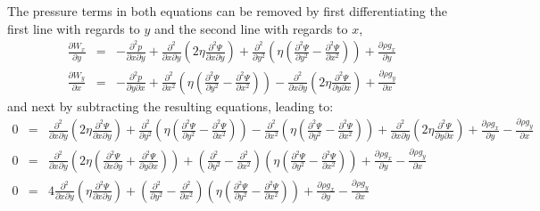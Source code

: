 The pressure terms in both equations can be removed by first differentiating
the first line with regards to $y$ and the second line with regards to $x$, 
\begin{eqnarray}
\frac{\partial W_x}{\partial y}&=&-\frac{\partial^2 p}{\partial x \partial y} 
+ \frac{\partial^2 }{\partial x \partial y} \left(2\eta \frac{\partial^2 \Psi}{\partial x \partial y} \right)
+ \frac{\partial^2 }{\partial y^2} \left( \eta (\frac{\partial^2 \Psi}{\partial y^2}-\frac{\partial^2 \Psi}{\partial x^2}) \right)
+ \frac{\partial \rho g_x}{\partial y}
\\
\frac{\partial W_y}{\partial x}&=&-\frac{\partial^2 p}{\partial y \partial x} 
+ \frac{\partial^2 }{\partial x^2} \left( \eta (\frac{\partial^2 \Psi}{\partial y^2}-\frac{\partial^2 \Psi}{\partial x^2}) \right) 
- \frac{\partial^2 }{\partial x\partial y} \left(2\eta \frac{\partial^2 \Psi}{\partial y \partial x} \right)
+ \frac{\partial \rho g_y}{\partial x}
\end{eqnarray}
and next by subtracting the resulting equations, leading to:
\begin{eqnarray}
0 &=& 
\frac{\partial^2 }{\partial x \partial y} \left(2\eta \frac{\partial^2 \Psi}{\partial x \partial y} \right)
+ \frac{\partial^2 }{\partial y^2} \left( \eta (\frac{\partial^2 \Psi}{\partial y^2}-\frac{\partial^2 \Psi}{\partial x^2}) \right)
- \frac{\partial^2 }{\partial x^2} \left( \eta (\frac{\partial^2 \Psi}{\partial y^2}-\frac{\partial^2 \Psi}{\partial x^2}) \right) 
+ \frac{\partial^2 }{\partial x\partial y} \left(2\eta \frac{\partial^2 \Psi}{\partial y \partial x} \right)
+ \frac{\partial \rho g_x}{\partial y}
- \frac{\partial \rho g_y}{\partial x}
\nonumber\\
0 &=& 
\frac{\partial^2 }{\partial x \partial y} 
\left(2\eta (\frac{\partial^2 \Psi}{\partial x \partial y} 
+  \frac{\partial^2 \Psi}{\partial y \partial x} )
\right)
+ 
\left( 
\frac{\partial^2 }{\partial y^2}
- \frac{\partial^2 }{\partial x^2}
\right)
\left( \eta (\frac{\partial^2 \Psi}{\partial y^2}-\frac{\partial^2 \Psi}{\partial x^2}) \right)
+ \frac{\partial \rho g_x}{\partial y}
- \frac{\partial \rho g_y}{\partial x}
\nonumber\\
0 &=& 
4\frac{\partial^2 }{\partial x \partial y} 
\left(\eta \frac{\partial^2 \Psi}{\partial x \partial y} 
\right)
+ 
\left( 
\frac{\partial^2 }{\partial y^2}
- \frac{\partial^2 }{\partial x^2}
\right)
\left( \eta (\frac{\partial^2 \Psi}{\partial y^2}-\frac{\partial^2 \Psi}{\partial x^2}) \right)
+ \frac{\partial \rho g_x}{\partial y}
- \frac{\partial \rho g_y}{\partial x}
\end{eqnarray}
